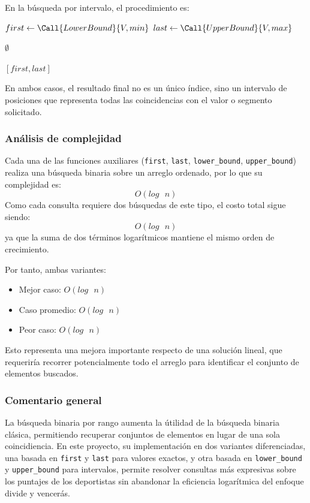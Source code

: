 En la búsqueda por intervalo, el procedimiento es:
\begin{algorithm}
    \caption{Rango de valores entre mínimo y máximo $\triangleright$ $V[0..n-1]$}
    \begin{algorithmic}[1]
        
        \State $first \gets \Call{LowerBound}{V, min}$
        \State $last \gets \Call{UpperBound}{V, max}$

            \State \Return $\emptyset$
        \EndIf

        \State \Return $[first, last]$

        \EndProcedure
    \end{algorithmic}
\end{algorithm}

En ambos casos, el resultado final no es un único índice, sino un intervalo de posiciones que representa todas las coincidencias con el valor o segmento solicitado.

\subsubsection{Análisis de complejidad}
Cada una de las funciones auxiliares (\texttt{first}, \texttt{last}, \texttt{lower\_bound}, \texttt{upper\_bound}) realiza una búsqueda binaria sobre un arreglo ordenado, por lo que su complejidad es: $$O(log\text{ }n)$$ Como cada consulta requiere dos búsquedas de este tipo, el costo total sigue siendo: $$O(log\text{ }n)$$ ya que la suma de dos términos logarítmicos mantiene el mismo orden de crecimiento.

Por tanto, ambas variantes:
\begin{itemize}
    \item Mejor caso: $O(log\text{ }n)$
    \item Caso promedio: $O(log\text{ }n)$
    \item Peor caso: $O(log\text{ }n)$
\end{itemize}

Esto representa una mejora importante respecto de una solución lineal, que requeriría recorrer potencialmente todo el arreglo para identificar el conjunto de elementos buscados.

\subsubsection{Comentario general}
La búsqueda binaria por rango aumenta la útilidad de la búsqueda binaria clásica, permitiendo recuperar conjuntos de elementos en lugar de una sola coincidiencia. En este proyecto, su implementación en dos variantes diferenciadas, una basada en \texttt{first} y \texttt{last} para valores exactos, y otra basada en \texttt{lower\_bound} y \texttt{upper\_bound} para intervalos, permite resolver consultas más expresivas sobre los puntajes de los deportistas sin abandonar la eficiencia logarítmica del enfoque divide y vencerás.
